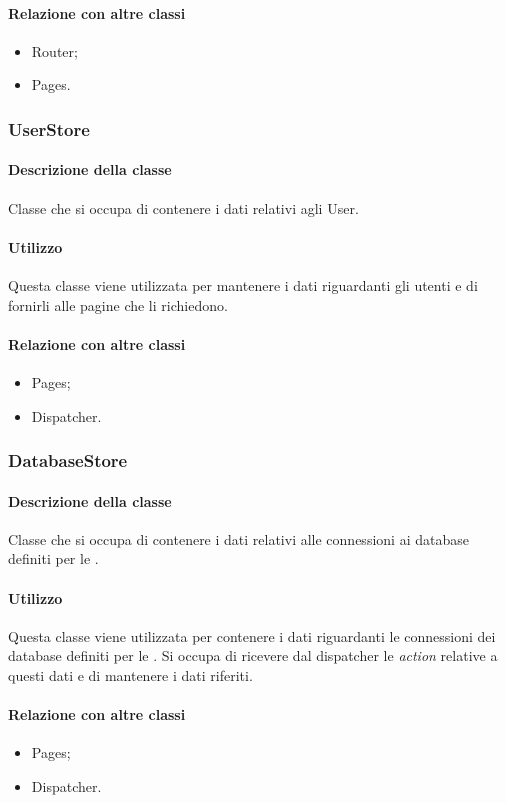 \paragraph*{Relazione con altre classi}
\begin{itemize}
\item Router;
\item Pages.
\end{itemize}

\subsubsection{UserStore}
\paragraph*{Descrizione della classe}
Classe che si occupa di contenere i dati relativi agli User.
\paragraph*{Utilizzo}
Questa classe viene utilizzata per mantenere i dati riguardanti gli utenti e di fornirli alle pagine che li richiedono.
\paragraph*{Relazione con altre classi}
\begin{itemize}
\item Pages;
\item Dispatcher.
\end{itemize}

\subsubsection{DatabaseStore}
\paragraph*{Descrizione della classe}
Classe che si occupa di contenere i dati relativi alle connessioni ai database definiti per le .
\paragraph*{Utilizzo}
Questa classe viene utilizzata per contenere i dati riguardanti le connessioni dei database definiti per le . Si occupa di ricevere dal dispatcher le \textit{action} relative a questi dati e di mantenere i dati riferiti.
\paragraph*{Relazione con altre classi}
\begin{itemize}
\item Pages;
\item Dispatcher.
\end{itemize}

